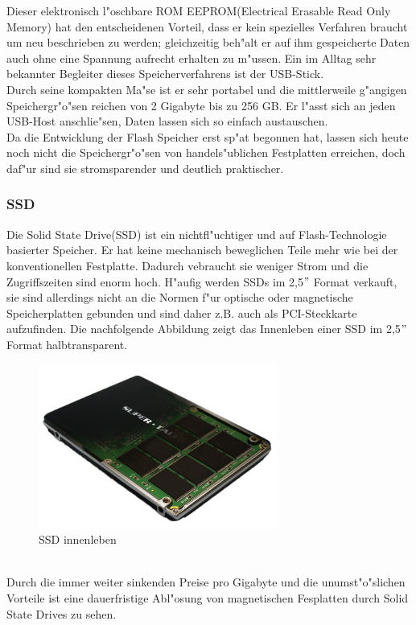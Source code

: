 					Dieser elektronisch l"oschbare ROM EEPROM(\glqq Electrical Erasable Read Only Memory\grqq{}) hat den entscheidenen Vorteil, dass er kein spezielles Verfahren braucht um neu beschrieben zu werden; gleichzeitig beh"alt er auf ihm gespeicherte Daten auch ohne eine Spannung aufrecht erhalten zu m"ussen. Ein im Alltag sehr bekannter Begleiter dieses Speicherverfahrens ist der USB-Stick. 
					\\
					Durch seine kompakten Ma"se ist er sehr portabel und die mittlerweile g"angigen Speichergr"o"sen reichen von 2 Gigabyte bis zu 256 GB. Er l"asst sich an jeden USB-Host anschlie"sen, Daten lassen sich so einfach austauschen. 
					\\
					Da die Entwicklung der Flash Speicher erst sp"at begonnen hat, lassen sich heute noch nicht die Speichergr"o"sen von handels"ublichen Festplatten erreichen, doch daf"ur sind sie stromsparender und deutlich praktischer.
				
				\subsubsection{SSD}
				\label{ch:Technisch:sec:Elektronische Speicherung:sub:Fl"uchtig:subsub:SSD}
				
				Die Solid State Drive(SSD) ist ein nichtfl"uchtiger und auf Flash-Technologie basierter Speicher. Er hat keine mechanisch beweglichen Teile mehr wie bei der konventionellen Festplatte. Dadurch vebraucht sie weniger Strom und die Zugriffszeiten sind enorm hoch. H"aufig werden SSDs im 2,5$"$ Format verkauft, sie sind allerdings nicht an die Normen f"ur optische oder magnetische Speicherplatten gebunden und sind daher z.B. auch als PCI-Steckkarte aufzufinden. Die nachfolgende Abbildung zeigt das Innenleben einer SSD im 2,5$"$ Format halbtransparent.
				\begin{figure}[ht]
				\centering
				\includegraphics[width=0.7\textwidth]{images/ssd} 
				\caption[SSD innenleben \cite{fig:ssd}]{SSD innenleben}
				\label{fig:ssd}
				\end{figure}
				\\
				Durch die immer weiter sinkenden Preise pro Gigabyte und die unumst"o"slichen Vorteile ist eine dauerfristige Abl"osung von magnetischen Fesplatten durch Solid State Drives zu sehen.
				

